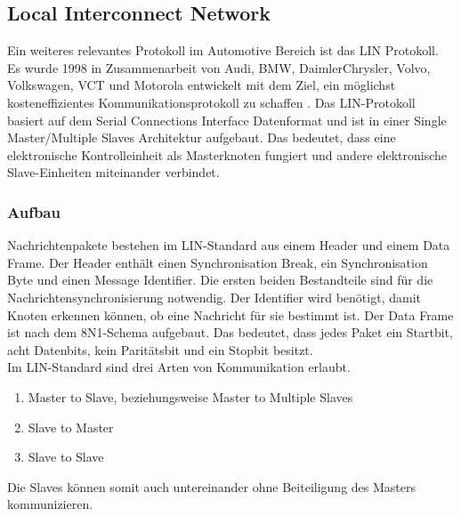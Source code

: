\subsection{Local Interconnect Network}
Ein weiteres relevantes Protokoll im Automotive Bereich ist das \ac{LIN} Protokoll. Es wurde 1998 in Zusammenarbeit von Audi, BMW, DaimlerChrysler, Volvo, Volkswagen, VCT und Motorola entwickelt mit dem Ziel, ein möglichst kosteneffizientes Kommunikationsprotokoll zu schaffen \cite[57]{Fijalkowski.2011}.
Das \acs{LIN}-Protokoll basiert auf dem Serial Connections Interface Datenformat und ist in einer Single Master/Multiple Slaves Architektur aufgebaut. Das bedeutet, dass eine elektronische Kontrolleinheit als Masterknoten fungiert und andere elektronische Slave-Einheiten miteinander verbindet.


\subsubsection{Aufbau}
Nachrichtenpakete bestehen im \acs{LIN}-Standard aus einem Header und einem Data Frame. Der Header enthält einen Synchronisation Break, ein Synchronisation Byte und einen Message Identifier. Die ersten beiden Bestandteile sind für die Nachrichtensynchronisierung notwendig. Der Identifier wird benötigt, damit Knoten erkennen können, ob eine Nachricht für sie bestimmt ist. Der Data Frame ist nach dem 8N1-Schema aufgebaut. Das bedeutet, dass jedes Paket ein Startbit, acht Datenbits, kein Paritätsbit und ein Stopbit besitzt. \cite[58]{Fijalkowski.2011} \\
Im \acs{LIN}-Standard sind drei Arten von Kommunikation erlaubt.
\begin{enumerate}
\item Master to Slave, beziehungsweise Master to Multiple Slaves
\item Slave to Master
\item Slave to Slave
\end{enumerate}
Die Slaves können somit auch untereinander ohne Beiteiligung des Masters kommunizieren. \cite[59]{Fijalkowski.2011}

